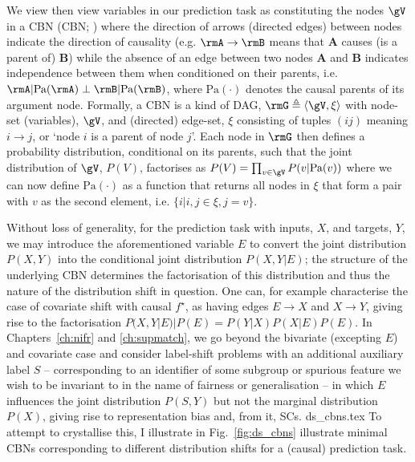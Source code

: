 We view then view variables in our prediction task as constituting the nodes \( \gV \) in a
\acl{CBN} (\acs{CBN}; \citealp{pearl1995bayesian}) where the direction of arrows (directed edges)
between nodes indicate the direction of causality (e.g. \(\rmA \to \rmB \) means that \textbf{A}
causes (is a parent of) \textbf{B}) while the absence of an edge between two nodes \textbf{A} and
\textbf{B} indicates independence between them when conditioned on their parents, i.e. \( \rmA |
\text{Pa}(\rmA) \perp \rmB | \text{Pa}(\rmB) \), where \( \text{Pa}(\cdot) \) denotes the causal
parents of its argument node.
%
Formally, a \ac{CBN} is a kind of \ac{DAG}, \(\rmG \triangleq \langle \gV, \xi
\rangle \) with node-set (variables), \(\gV\), and (directed) edge-set, \(\xi\) consisting of
tuples \((ij)\) meaning \(i \to j \), or `node \(i\) is a parent of node \(j\)'.
%
Each node in \( \rmG \) then defines a probability distribution, conditional on its parents, such
that the joint distribution of \(\gV\), \( P(V) \), factorises as \( P(V) = \prod_{v \in \gV} P(v |
\text{Pa}(v)) \) where we can now define \(\text{Pa}(\cdot)\) as a function that returns all nodes
in \(\xi\) that form a pair with \(v\) as the second element, i.e. \( \{ i | i,j \in \xi, j = v \}
\).
%

Without loss of generality, for the prediction task with inputs, \(X\), and targets, \(Y\), we may
introduce the aforementioned variable \(E\) to convert the joint distribution \(P(X, Y)\) into the
conditional joint distribution \( P(X, Y | E ) \); the structure of the underlying \ac{CBN}
determines the factorisation of this distribution and thus the nature of the distribution shift in
question.
%
One can, for example characterise the case of covariate shift with causal \(f^\star\), as having
edges  \(E \to X\) and \( X \to Y \), giving rise to the factorisation \( P(X, Y | E) | P(E) =
P(Y|X)P(X|E)P(E) \). 
%
In Chapters~\ref{ch:nifr} and \ref{ch:supmatch}, we go beyond the bivariate (excepting \( E \)) and
covariate case and consider label-shift problems with an additional auxiliary label \(S\) --
corresponding to an identifier of some subgroup or spurious feature we wish to be invariant to in
the name of fairness or generalisation --  in which \(E\) influences the joint distribution \( P(S,
Y) \) but not the marginal distribution \(P(X)\), giving rise to representation bias and, from it,
\acp{SC}.
%
%
{ds_cbns.tex}
%
To attempt to crystallise this, I illustrate in Fig.~\ref{fig:ds_cbns} illustrate minimal \acp{CBN}
corresponding to different distribution shifts for a (causal) prediction task.

